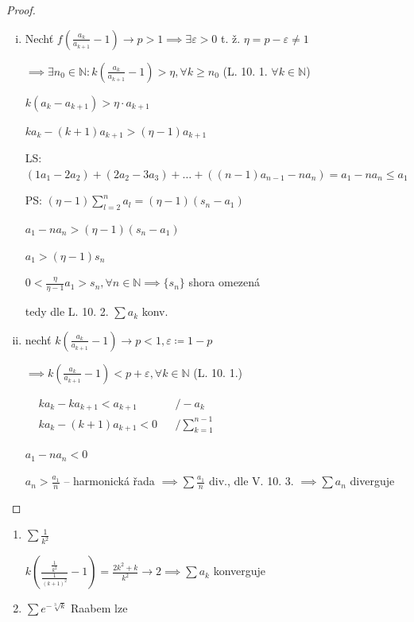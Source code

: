\begin{proof}
  \begin{enumerate}[i)]
    \item Nechť $f(\frac{a_k}{a_{k+1}}-1) \to p >1 \implies \exists \varepsilon>0$ t. ž. $\eta = p - \varepsilon \neq 1$

    $\implies \exists n_0 \in \mathbb N: k(\frac{a_k}{a_{k+1}}-1) > \eta, \forall k \geq n_0$ (L. 10. 1. $\forall k \in \mathbb N$)

    $k(a_k - a_{k+1}) > \eta \cdot a_{k+1}$

    $ka_k - (k+1)a_{k+1} > (\eta -1)a_{k+1}$

    LS: $(1a_1-2a_2)+(2a_2-3a_3)+\dots+((n-1)a_{n-1}-na_n)=a_1 -na_n \leq a_1$

    PS: $(\eta -1) \sum_{l=2}^{n} a_l = (\eta -1)(s_n - a_1)$

    $a_1 - na_n > (\eta -1)(s_n - a_1)$

    $a_1 > (\eta -1)s_n$

    $0<\frac{\eta}{\eta -1}a_1>s_n, \forall n \in \mathbb N \implies \{s_n\}$ shora omezená

    tedy dle L. 10. 2. $\sum a_k$ konv.
    \item nechť $k(\frac{a_k}{a_{k+1}}-1) \to p < 1, \varepsilon \coloneq 1 - p$

    $\implies k(\frac{a_k}{a_{k+1}}-1)<p + \varepsilon, \forall k \in \mathbb N$ (L. 10. 1.)

    $\begin{aligned}
      &ka_k - ka_{k+1}<a_{k+1} &&  /-a_k \\
      &ka_k-(k+1)a_{k+1}<0 && /\sum_{k=1}^{n-1}
    \end{aligned}$

    $a_1 - na_n < 0$

    $a_n > \frac{a_1}{n}$ -- harmonická řada $\implies \sum \frac{a_1}{n}$ div., dle V. 10. 3. $\implies \sum a_n$ diverguje
  \end{enumerate}
\end{proof}

\begin{priklad}
  \begin{enumerate}[1)]
    \item $\sum \frac{1}{k^2}$

    $k(\frac{\frac{1}{k^2}}{\frac{1}{(k+1)^2}}-1) = \frac{2k^2+k}{k^2} \to 2 \implies \sum a_k$ konverguje

    \item $\sum e^{-\sqrt[3]{k}}$ Raabem lze
  \end{enumerate}
\end{priklad}

